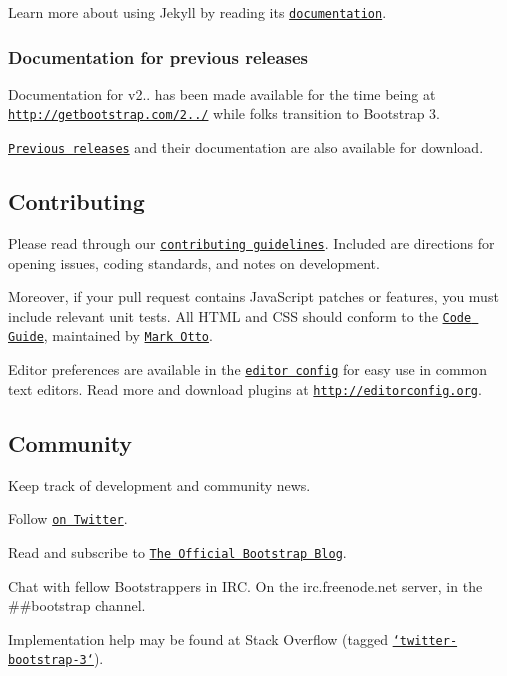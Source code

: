 Learn more about using Jekyll by reading its \href{http://jekyllrb.com/docs/home/}{\tt documentation}.

\subsubsection*{Documentation for previous releases}

Documentation for v2.. has been made available for the time being at \href{http://getbootstrap.com/2.3.2/}{\tt http\-://getbootstrap.\-com/2../} while folks transition to Bootstrap 3.

\href{https://github.com/twbs/bootstrap/releases}{\tt Previous releases} and their documentation are also available for download.

\subsection*{Contributing}

Please read through our \href{https://github.com/twbs/bootstrap/blob/master/CONTRIBUTING.md}{\tt contributing guidelines}. Included are directions for opening issues, coding standards, and notes on development.

Moreover, if your pull request contains Java\-Script patches or features, you must include relevant unit tests. All H\-T\-M\-L and C\-S\-S should conform to the \href{https://github.com/mdo/code-guide}{\tt Code Guide}, maintained by \href{https://github.com/mdo}{\tt Mark Otto}.

Editor preferences are available in the \href{https://github.com/twbs/bootstrap/blob/master/.editorconfig}{\tt editor config} for easy use in common text editors. Read more and download plugins at \href{http://editorconfig.org}{\tt http\-://editorconfig.\-org}.

\subsection*{Community}

Keep track of development and community news.


\begin{DoxyItemize}
\item Follow \href{https://twitter.com/twbootstrap}{\tt on Twitter}.
\item Read and subscribe to \href{http://blog.getbootstrap.com}{\tt The Official Bootstrap Blog}.
\item Chat with fellow Bootstrappers in I\-R\-C. On the {\ttfamily irc.\-freenode.\-net} server, in the {\ttfamily \#\#bootstrap} channel.
\item Implementation help may be found at Stack Overflow (tagged \href{http://stackoverflow.com/questions/tagged/twitter-bootstrap-3}{\tt `twitter-\/bootstrap-\/3`}).
\end{DoxyItemize}


